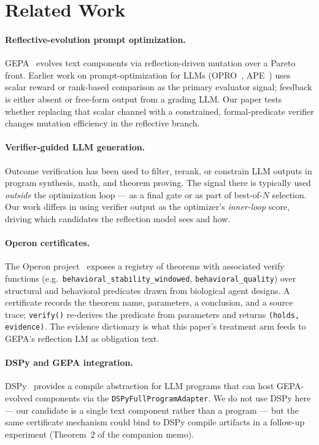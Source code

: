 \section{Related Work}\label{sec:related}

\paragraph{Reflective-evolution prompt optimization.}
GEPA~\cite{agrawal2025gepa} evolves text components via
reflection-driven mutation over a Pareto front.  Earlier work on
prompt-optimization for LLMs (OPRO~\cite{yang2024opro},
APE~\cite{zhou2022ape}) uses scalar reward or rank-based comparison
as the primary evaluator signal; feedback is either absent or
free-form output from a grading LLM.  Our paper tests whether
replacing that scalar channel with a constrained, formal-predicate
verifier changes mutation efficiency in the reflective branch.

\paragraph{Verifier-guided LLM generation.}  Outcome verification has
been used to filter, rerank, or constrain LLM outputs in program
synthesis, math, and theorem proving.  The signal there is typically
used \emph{outside} the optimization loop --- as a final gate or as
part of best-of-$N$ selection.  Our work differs in using verifier
output as the optimizer's \emph{inner-loop} score, driving which
candidates the reflection model sees and how.

\paragraph{Operon certificates.}  The Operon project~\cite{banu2026operon}
exposes a registry of theorems with associated verify functions
(e.g.\ \texttt{behavioral\_stability\_windowed},
\texttt{behavioral\_quality}) over structural and behavioral
predicates drawn from biological agent designs.  A certificate
records the theorem name, parameters, a conclusion, and a source
trace; \texttt{verify()} re-derives the predicate from parameters and
returns \texttt{(holds, evidence)}.  The evidence dictionary is what
this paper's treatment arm feeds to GEPA's reflection LM as
obligation text.

\paragraph{DSPy and GEPA integration.}  DSPy~\cite{khattab2024dspy}
provides a compile abstraction for LLM programs that can host
GEPA-evolved components via the \texttt{DSPyFullProgramAdapter}.  We
do not use DSPy here --- our candidate is a single text component
rather than a program --- but the same certificate mechanism could
bind to DSPy compile artifacts in a follow-up experiment (Theorem~2
of the companion memo).

